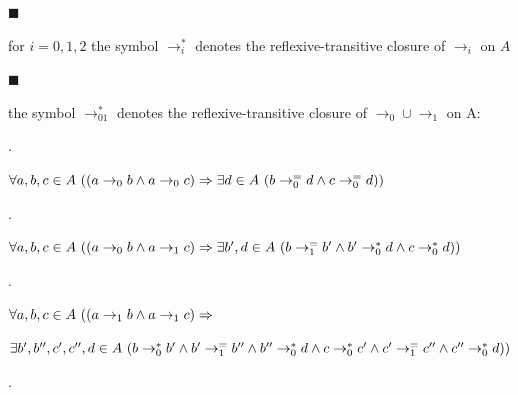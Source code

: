 \documentclass[10pt,a4paper]{amsart}
\begin{document}
 
 
\par\noindent  $\blacksquare$ 
 
for $i=0,1,2$ the symbol $\to_{i}^{*}$ denotes the reflexive-transitive closure of $\to_{i}$ on $A$\par
 
 
 
\par\noindent  $\blacksquare$ 
 
the symbol $\to_{01}^{*}$ denotes the reflexive-transitive closure of $\to_{0}\cup\to_{1}$ on A:\par
  
\par{}. 
 
$\forall a,b,c\in A\leavevmode\nobreak\ ((a\to_{0}b\wedge a\to_{0}c)\Rightarrow%
\exists d\in A\leavevmode\nobreak\ (b\to_{0}^{=}d\wedge c\to_{0}^{=}d))$\par
 
 
 
\par{}. 
 
$\forall a,b,c\in A\leavevmode\nobreak\ ((a\to_{0}b\wedge a\to_{1}c)\Rightarrow%
\exists b^{\prime},d\in A\leavevmode\nobreak\ (b\to_{1}^{=}b^{\prime}\wedge b^%
{\prime}\to_{0}^{*}d\wedge c\to_{0}^{*}d))$\par
 
 
 
\par{}. 
 
$\forall a,b,c\in A\leavevmode\nobreak\ ((a\to_{1}b\wedge a\to_{1}c)\Rightarrow$\par
 
 
 
$\exists b^{\prime},b^{\prime\prime},c^{\prime},c^{\prime\prime},d\in A%
\leavevmode\nobreak\ (b\to_{0}^{*}b^{\prime}\wedge b^{\prime}\to_{1}^{=}b^{%
\prime\prime}\wedge b^{\prime\prime}\to_{0}^{*}d\wedge c\to_{0}^{*}c^{\prime}%
\wedge c^{\prime}\to_{1}^{=}c^{\prime\prime}\wedge c^{\prime\prime}\to_{0}^{*}%
d))$\par
 
 
 
\par{}. 
 
\end{document}
